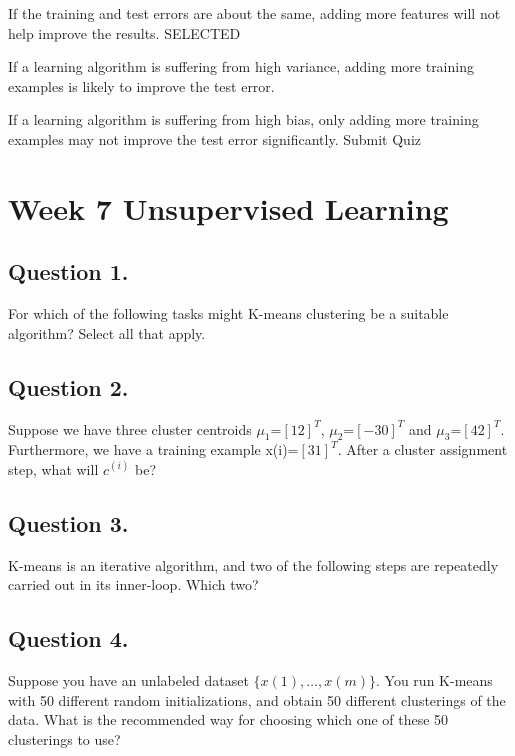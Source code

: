 If the training and test errors are about the same, adding more features will not help improve the results. SELECTED

If a learning algorithm is suffering from high variance, adding more training examples is likely to improve the test error.

If a learning algorithm is suffering from high bias, only adding more training examples may not improve the test error significantly.
Submit Quiz



\newpage
\section{Week 7 Unsupervised Learning}
\subsection*{Question 1. }
For which of the following tasks might K-means clustering be a suitable algorithm? Select all that apply.


\subsection*{Question 2.} 
Suppose we have three cluster centroids $\mu_1$=$[1 2]^T$, $\mu_2$=$[−3 0]^T$ and $\mu_3$=$[4 2]^T$. 
Furthermore, we have a training example x(i)=$[3 1]^T$. After a cluster assignment step, what will $c^{(i)}$ be?


\subsection*{Question 3.}
K-means is an iterative algorithm, and two of the following steps are repeatedly carried out in its inner-loop. Which two?


\subsection*{Question 4. }
Suppose you have an unlabeled dataset $\{x(1),\ldots,x(m)\}$. You run K-means with 50 different random
initializations, and obtain 50 different clusterings of the data. 
What is the recommended way for choosing which one of these 50 clusterings to use?

